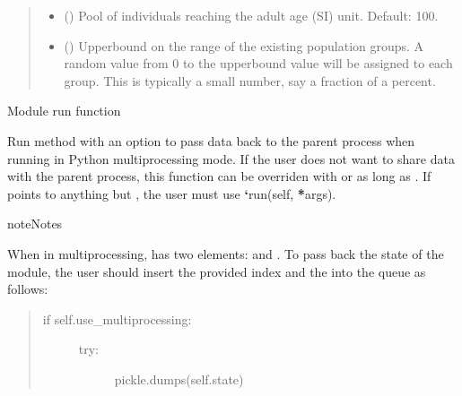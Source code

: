 \documentclass[letterpaper,10pt,openany,oneside,english]{sphinxmanual}
\begin{document}
\begin{fulllineitems}
\begin{fulllineitems}
\begin{quote}
\begin{description}
\begin{itemize}
\item {} 
 () \textendash{} Pool of individuals reaching the adult age (SI) unit. Default: 100.

\item {} 
 () \textendash{} Upperbound on the range of the existing population groups. A random value
from 0 to the upperbound value will be assigned to each group. This is
typically a small number, say a fraction of a percent.

\end{itemize}

\end{description}\end{quote}

\end{fulllineitems}


\begin{fulllineitems}
\label{\detokenize{examples_rst/community:community.Community.run}}
Module run function

Run method with an option to pass data back to the parent process when running
in Python multiprocessing mode. If the user does not want to share data with
the parent process, this function can be overriden with 
or  as long as .
If  points to anything but , the user must use
{\color{red}\bfseries{}{}`}run(self, {\color{red}\bfseries{}*}args).

\begin{sphinxadmonition}{note}{Notes}

When in multiprocessing,  has two elements:  and .
To pass back the state of the module, the user should insert the provided
index  and the  into the queue as follows:
\begin{quote}
\begin{description}
\item[{if self.use\_multiprocessing:}] \leavevmode\begin{description}
\item[{try:}] \leavevmode
pickle.dumps(self.state)


\end{description}
\end{description}
\end{quote}
\end{sphinxadmonition}
\end{fulllineitems}
\end{fulllineitems}
\end{document}
